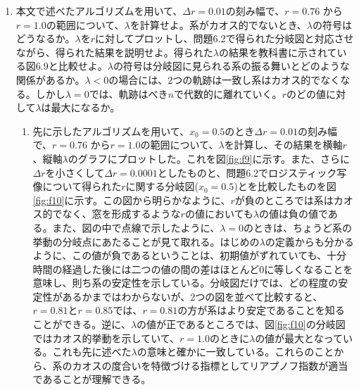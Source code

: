 \documentclass{jsarticle}
\begin{document}
\begin{enumerate}
\begin{enumerate}
            \end{enumerate}
            

            \item 本文で述べたアルゴリズムを用いて、$\Delta r = 0.01$の刻み幅で、$r=0.76$  から$r=1.0$の範囲について、$\lambda$を計算せよ。系がカオス的でないとき、$\lambda$の符号はどうなるか。$\lambda$を$r$に対してプロットし、問題6.2で得られた分岐図と対応させながら、得られた結果を説明せよ。得られた$\lambda$の結果を教科書に示されている図6.9と比較せよ。$\lambda$の符号は分岐図に見られる系の振る舞いとどのような関係があるか。$\lambda<0$の場合には、2つの軌跡は一致し系はカオス的でなくなる。しかし$\lambda= 0$では、軌跡はべき$n$で代数的に離れていく。$r$のどの値に対して$\lambda$は最大になるか。
            
            \begin{enumerate}
                \item 先に示したアルゴリズムを用いて、$x_{0}=0.5$のとき$\Delta r = 0.01$の刻み幅で、$r=0.76$ から$r=1.0$の範囲について、$\lambda$を計算し、その結果を横軸$r$、縦軸$\lambda$のグラフにプロットした。これを図\ref{fig:f9}に示す。また、さらに$\Delta r$を小さくして$\Delta r = 0.0001$としたものと、問題6.2でロジスティック写像について得られた$r$に関する分岐図($x_{0}=0.5$)とを比較したものを図\ref{fig:f10}に示す。この図から明らかなように、$r$が負のところでは系はカオス的でなく、窓を形成するような$r$の値においても$\lambda$の値は負の値である。また、図の中で点線で示したように、$\lambda=0$のときは、ちょうど系の挙動の分岐点にあたることが見て取れる。はじめの$\lambda$の定義からも分かるように、この値が負であるということは、初期値がずれていても、十分時間の経過した後には二つの値の間の差はほとんど0に等しくなることを意味し、則ち系の安定性を示している。分岐図だけでは、どの程度の安定性があるかまではわからないが、2つの図を並べて比較すると、$r=0.81$と$r=0.85$では、$r=0.81$の方が系はより安定であることを知ることができる。逆に、$\lambda$の値が正であるところでは、図\ref{fig:f10}の分岐図ではカオス的挙動を示していて、$r=1.0$のときに$\lambda$の値が最大となっている。これも先に述べた$\lambda$の意味と確かに一致している。これらのことから、系のカオスの度合いを特徴づける指標としてリアプノフ指数が適当であることが理解できる。
                

\end{enumerate}
\end{enumerate}
\end{document}
